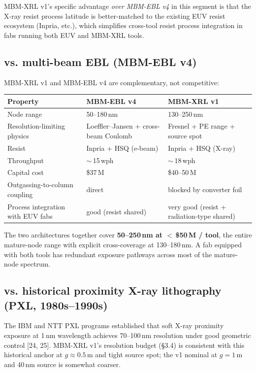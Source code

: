 \documentclass[11pt,letterpaper]{article}
\begin{document}
MBM-XRL v1's specific advantage \textit{over MBM-EBL v4} in this segment is that the X-ray resist process latitude is better-matched to the existing EUV resist ecosystem (Inpria, etc.), which simplifies cross-tool resist process integration in fabs running both EUV and MBM-XRL tools.

\subsection{vs. multi-beam EBL (MBM-EBL v4)}

MBM-XRL v1 and MBM-EBL v4 are complementary, not competitive:

\begin{center}
\begin{tabular}{lll}
\toprule
Property & MBM-EBL v4 & MBM-XRL v1 \\
\midrule
Node range & 50--180\,nm & 130--250\,nm \\
Resolution-limiting physics & Loeffler--Jansen + cross-beam Coulomb & Fresnel + PE range + source spot \\
Resist & Inpria + HSQ (e-beam) & Inpria + HSQ (X-ray) \\
Throughput & $\sim$\,15\,wph & $\sim$\,18\,wph \\
Capital cost & \$37\,M & \$40--50\,M \\
Outgassing-to-column coupling & direct & blocked by converter foil \\
Process integration with EUV fabs & good (resist shared) & very good (resist + radiation-type shared) \\
\bottomrule
\end{tabular}
\end{center}

The two architectures together cover \textbf{50--250\,nm at $<$\,\$50\,M / tool}, the entire mature-node range with explicit cross-coverage at 130--180\,nm. A fab equipped with both tools has redundant exposure pathways across most of the mature-node spectrum.

\subsection{vs. historical proximity X-ray lithography (PXL, 1980s--1990s)}

The IBM and NTT PXL programs established that soft X-ray proximity exposure at 1\,nm wavelength achieves 70--100\,nm resolution under good geometric control [24, 25]. MBM-XRL v1's resolution budget (\S 3.4) is consistent with this historical anchor at $g \approx 0.5$\,\textmu m and tight source spot; the v1 nominal at $g = 1$\,\textmu m and 40\,nm source is somewhat coarser.
\end{document}
